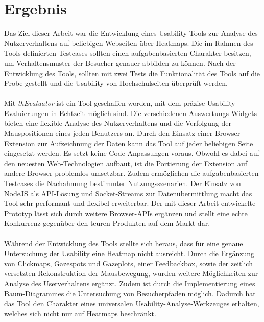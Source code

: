 %
%
%
%

\chapter{Ergebnis}

Das Ziel dieser Arbeit war die Entwicklung eines Usability-Tools zur Analyse des Nutzerverhaltens auf beliebigen Webseiten über Heatmaps. Die im Rahmen des Tools definierten Testcases sollten einen aufgabenbasierten Charakter besitzen, um Verhaltensmuster der Besucher genauer abbilden zu können. Nach der Entwicklung des Tools, sollten mit zwei Tests die Funktionalität des Tools auf die Probe gestellt und die Usability von Hochschulseiten überprüft werden.\\
\\
Mit \textit{thEvaluator} ist ein Tool geschaffen worden, mit dem präzise Usability-Evaluierungen in Echtzeit möglich sind. Die verschiedenen Auswertungs-Widgets bieten eine flexible Analyse des Nutzerverhaltens und die Verfolgung der Mauspositionen eines jeden Benutzers an. Durch den Einsatz einer Browser-Extension zur Aufzeichnung der Daten kann das Tool auf jeder beliebigen Seite eingesetzt werden. Es setzt keine Code-Anpassungen voraus. Obwohl es dabei auf den neuesten Web-Technologien aufbaut, ist die Portierung der Extension auf andere Browser problemlos umsetzbar. Zudem ermöglichen die aufgabenbasierten Testcases die Nachahmung bestimmter Nutzungsszenarien. Der Einsatz von NodeJS als API-Lösung und Socket-Streams zur Datenübermittlung macht das Tool sehr performant und flexibel erweiterbar. Der mit dieser Arbeit entwickelte Prototyp lässt sich durch weitere Browser-APIs ergänzen und stellt eine echte Konkurrenz gegenüber den teuren Produkten auf dem Markt dar.\\
\\
Während der Entwicklung des Tools stellte sich heraus, dass für eine genaue Untersuchung der Usability eine Heatmap nicht ausreicht. Durch die Ergänzung von Clickmaps, Gazespots und Gazeplots, einer Feedbackbox, sowie der zeitlich versetzten Rekonstruktion der Mausbewegung, wurden weitere Möglichkeiten zur Analyse des Userverhaltens ergänzt. Zudem ist durch die Implementierung eines Baum-Diagrammes die Untersuchung von Besucherpfaden möglich. Dadurch hat das Tool den Charakter eines universalen Usability-Analyse-Werkzeuges erhalten, welches sich nicht nur auf Heatmaps beschränkt.\\
